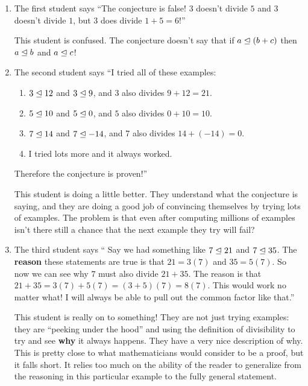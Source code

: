 \begin{enumerate}
	\item The first student says ``The conjecture is false!  $3$ doesn't divide $5$ and $3$ doesn't divide $1$, but $3$ does divide $1+5 = 6$!''
	
	\medskip
	
	This student is confused.  The conjecture doesn't say that if $a \trianglelefteq (b+c)$ then $a \trianglelefteq b$ and $a \trianglelefteq c$!
	
	\item The second student says ``I tried all of these examples:
	\begin{enumerate}
		\item $3 \trianglelefteq 12$ and $3 \trianglelefteq 9$, and $3$ also divides $9+12 = 21$.
		\item $5 \trianglelefteq 10$ and $5 \trianglelefteq 0$, and $5$ also divides $0+10 = 10$.
		\item $7 \trianglelefteq 14$ and $7 \trianglelefteq -14$, and $7$ also divides $14 + (-14) = 0$.
		\item I tried lots more and it always worked.  
	\end{enumerate}
	
	Therefore the conjecture is proven!''
	
	\medskip
	
	This student is doing a little better.  They understand what the conjecture is saying, and they are doing a good job of convincing themselves by trying lots of examples.  The problem is that even after computing millions of examples isn't there still a chance that the next example they try will fail?
	
	\item The third student says `` Say we had something like $7 \trianglelefteq 21$ and $7 \trianglelefteq 35$.  The \textbf{reason} these statements are true is that $21 = 3(7) $ and $35 = 5(7)$.  So now we can see why $7$ must also divide $21+35$.  The reason is that $21 + 35 = 3(7)+5(7) = (3+5)(7) = 8(7)$.  This would work no matter what!  I will always be able to pull out the common factor like that.''
	
	\medskip
	
	This student is really on to something!  They are not just trying examples:  they are ``peeking under the hood'' and using the definition of divisibility to try and see \textbf{why} it always happens.  They have a very nice description of why.  This is pretty close to what mathematicians would consider to be a proof, but it falls short.  It relies too much on the ability of the reader to generalize from the reasoning in this particular example to the fully general statement.
	

\end{enumerate}
